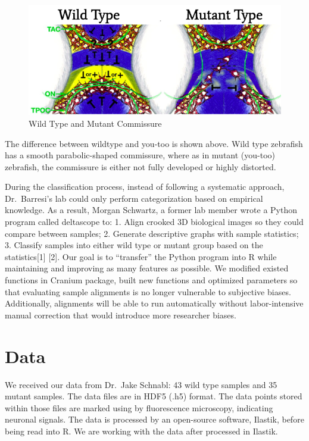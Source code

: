 \documentclass[10pt,letterpaper]{article}
\begin{document}
\begin{figure}[H]
\includegraphics[width=0.9\linewidth]{visualization_paper/wt_yt} \caption{Wild Type and Mutant Commissure}\label{fig:Figure1}
\end{figure}

The difference between wildtype and you-too is shown above. Wild type
zebrafish has a smooth parabolic-shaped commissure, where as in mutant
(you-too) zebrafish, the commissure is either not fully developed or
highly distorted.

During the classification process, instead of following a systematic
approach, Dr.~Barresi's lab could only perform categorization based on
empirical knowledge. As a result, Morgan Schwartz, a former lab member
wrote a Python program called deltascope to: 1. Align crooked 3D
biological images so they could compare between samples; 2. Generate
descriptive graphs with sample statistics; 3. Classify samples into
either wild type or mutant group based on the statistics{[}1{]} {[}2{]}.
Our goal is to ``transfer'' the Python program into R while maintaining
and improving as many features as possible. We modified existed
functions in Cranium package, built new functions and optimized
parameters so that evaluating sample alignments is no longer vulnerable
to subjective biases. Additionally, alignments will be able to run
automatically without labor-intensive manual correction that would
introduce more researcher biases.

\hypertarget{data}{%
\section{Data}\label{data}}

We received our data from Dr.~Jake Schnabl: 43 wild type samples and 35
mutant samples. The data files are in HDF5 (.h5) format. The data points
stored within those files are marked using by fluorescence microscopy,
indicating neuronal signals. The data is processed by an open-source
software, Ilastik, before being read into R. We are working with the
data after processed in Ilastik.
\end{document}
